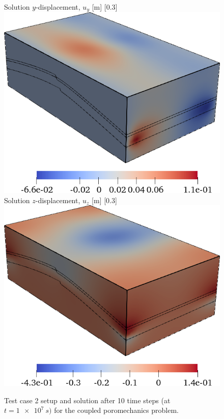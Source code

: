 \begin{figure} [htbp]
    {
        Solution $y$-displacement, $u_y$ [\unit{m}]
        \label{fig:mazumodel2_geosx_sol_y}
    }
    [0.3\textwidth]
    {
        \includegraphics[width=\linewidth]{figs/MazuModel2/geosx/poro_sol_y}
    }
    \hfill
    \subcaptionbox
    {
        Solution $z$-displacement, $u_z$ [\unit{m}]
        \label{fig:mazumodel2_geosx_sol_z}
    }
    [0.3\textwidth]
    {
        \includegraphics[width=\linewidth]{figs/MazuModel2/geosx/poro_sol_z}
    }
    \caption[Test case 2 setup]{Test case 2 setup and solution after 10 time steps (at $t = \qty{1e7}{s})$ for the coupled poromechanics problem.}
    \label{fig:mazumodel2_geosx_setup}
\end{figure}

